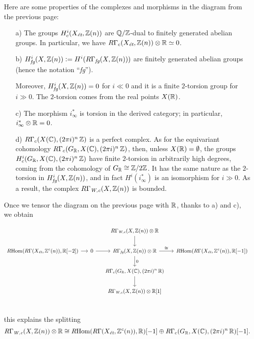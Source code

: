 \documentclass{article}
\theoremstyle{plain}
\begin{document}
Here are some properties of the complexes and morphisms in the diagram from the
previous page:

\begin{enumerate}
\item[a)] The groups $H_c^i (X_\text{\it ét}, \mathbb{Z} (n))$ are $\mathbb{Q}/\mathbb{Z}$-dual to
  finitely generated abelian groups. In particular, we have
  $R\Gamma_c (X_\text{\it ét}, \mathbb{Z} (n)) \otimes \mathbb{R} \simeq 0$.

\item[b)]
  $H_\text{\it fg}^i (X, \mathbb{Z} (n)) \mathrel{\mathop:}= H^i (R\Gamma_\text{\it fg} (X, \mathbb{Z} (n)))$
  are finitely generated abelian groups (hence the notation ``\emph{fg}'').

  Moreover, $H_\text{\it fg}^i (X, \mathbb{Z} (n)) = 0$ for $i \ll 0$ and it is a
  finite $2$-torsion group for $i \gg 0$. The $2$-torsion comes from the real
  points $X (\mathbb{R})$.

\item[c)] The morphism $i_\infty^*$ is torsion in the derived category;
  in particular, $i_\infty^* \otimes \mathbb{R} = 0$.

\item[d)] $R\Gamma_c (X (\mathbb{C}), (2\pi i)^n\,\mathbb{Z})$ is a perfect complex. As for
  the equivariant cohomology $R\Gamma_c (G_{\mathbb{R}}, X (\mathbb{C}), (2\pi i)^n\,\mathbb{Z})$,
  then, unless $X (\mathbb{R}) = \emptyset$, the groups
  $H_c^i (G_{\mathbb{R}}, X (\mathbb{C}), (2\pi i)^n\,\mathbb{Z})$ have finite $2$-torsion in
  arbitrarily high degrees, coming from the cohomology of
  $G_{\mathbb{R}} \cong \mathbb{Z}/2\mathbb{Z}$. It has the same nature as the $2$-torsion in
  $H_\text{\it fg}^i (X, \mathbb{Z} (n))$, and in fact $H^i (i_\infty^*)$ is an
  isomorphism for $i \gg 0$. As a result, the complex
  $R\Gamma_\text{\it W,c} (X, \mathbb{Z} (n))$ is bounded.
\end{enumerate}

Once we tensor the diagram on the previous page with $\mathbb{R}$, thanks to a) and c),
we obtain

\[ \begin{tikzcd}[column sep=small, font=\small]
    & & R\Gamma_\text{\it W,c} (X, \ZZ (n))\otimes \RR\ar{d} \\
    \RHom (R\Gamma (X_\text{\it ét}, \ZZ^c (n)), \RR [-2]) \ar{r} & 0 \ar{r} & R\Gamma_\text{\it fg} (X, \ZZ (n))\otimes \RR \ar{r}{\isom}\ar{d}{0} & \RHom (R\Gamma (X_\text{\it ét}, \ZZ^c (n)), \RR [-1]) \\
    & & R\Gamma_c (G_\RR, X (\CC), (2\pi i)^n\,\RR)\ar{d} \\
    & & R\Gamma_\text{\it W,c} (X, \ZZ (n))\otimes \RR [1] \\
  \end{tikzcd} \]

\noindent this explains the splitting
\[ R\Gamma_\text{\it W,c} (X,\mathbb{Z}(n)) \otimes \mathbb{R} \cong
  R\!\operatorname{Hom} (R\Gamma (X_\text{\it ét}, \mathbb{Z}^c (n)), \mathbb{R}) [-1]
  \oplus
  R\Gamma_c (G_{\mathbb{R}}, X (\mathbb{C}), (2\pi i)^n\,\mathbb{R}) [-1]. \]

\pagebreak



\end{document}
